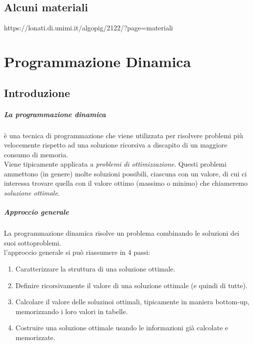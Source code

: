 \documentclass[12pt, a4paper, openany]{book}
\begin{document}
\section*{Alcuni materiali}
https://lonati.di.unimi.it/algopig/2122/?page=materiali


\chapter{Programmazione Dinamica}
\section{Introduzione}
\paragraph{La programmazione dinamica} è una tecnica di programmazione che viene utilizzata per risolvere problemi più velocemente rispetto ad una soluzione ricorsiva a discapito di un maggiore consumo di memoria.
\\Viene tipicamente applicata a \emph{problemi di ottimizzazione}. Questi problemi ammettono (in genere) molte soluzioni possibili, ciascuna con un valore, di cui ci interessa trovare quella con il valore ottimo (massimo o minimo) che chiameremo \emph{soluzione ottimale}.

\paragraph{Approccio generale}
La programmazione dinamica risolve un problema combinando le soluzioni dei suoi sottoproblemi.\\
l'approccio generale si può riassumere in 4 passi:
\begin{enumerate}
	\item Caratterizzare la struttura di una soluzione ottimale.
	\item Definire ricorsivamente il valore di una soluzione ottimale (e quindi di tutte).
	\item Calcolare il valore delle soluzinoi ottimali, tipicamente in maniera bottom-up,
	      memorizzando i loro valori in tabelle.
	\item Costruire una soluzione ottimale usando le informazioni già calcolate e memorizzate.
\end{enumerate}
\end{document}
